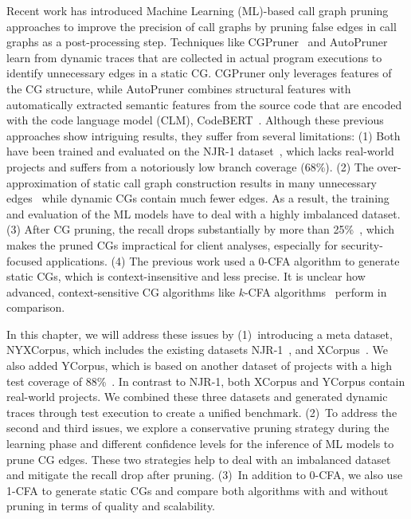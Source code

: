 Recent work has introduced Machine Learning (ML)-based call graph pruning approaches to improve the precision of call graphs by pruning false edges in call graphs as a post-processing step.
Techniques like CGPruner~\cite{utture2022striking} and AutoPruner~\cite{le2022autopruner} learn from dynamic traces that are collected in actual program executions to identify unnecessary edges in a static CG.
CGPruner only leverages features of the CG structure, while AutoPruner combines structural features with automatically extracted semantic features from the source code that are encoded with the code language model (CLM), CodeBERT~\cite{feng2020codebert}.
Although these previous approaches show intriguing results, they suffer from several limitations:
%
(1) Both have been trained and evaluated on the NJR-1 dataset~\cite{palsberg2018njr}, which lacks real-world projects and suffers from a notoriously low branch coverage (68\%).
%
(2)
The over-approximation of static call graph construction results in many unnecessary edges~\cite{reif2021novel} while dynamic CGs contain much fewer edges.
As a result, the training and evaluation of the ML models have to deal with a highly imbalanced dataset.
%
(3) After CG pruning, the recall drops substantially by more than 25\%~\cite{le2022autopruner}, which makes the pruned CGs impractical for client analyses, especially for security-focused applications.
%
(4) The previous work used a 0-CFA algorithm to generate static CGs, which is context-insensitive and less precise.
It is unclear how advanced, context-sensitive CG algorithms like $k$-CFA algorithms~\cite{shivers1991control} perform in comparison.

In this chapter, we will address these issues by
(1)~introducing a meta dataset, NYXCorpus, which includes the existing datasets NJR-1~\cite{palsberg2018njr}, and XCorpus~\cite{dietrich2017xcorpus}.
We also added YCorpus, which is based on another dataset of projects with a high test coverage of 88\%~\cite{khatami2023state}.
In contrast to NJR-1, both XCorpus and YCorpus contain real-world projects.
We combined these three datasets and generated dynamic traces through test execution to create a unified benchmark.
(2)~To address the second and third issues, we explore a conservative pruning strategy during the learning phase and different confidence levels for the inference of ML models to prune CG edges. These two strategies help to deal with an imbalanced dataset and mitigate the recall drop after pruning.
(3)~In addition to 0-CFA, we also use 1-CFA to generate static CGs and compare both algorithms with and without pruning in terms of quality and scalability.

